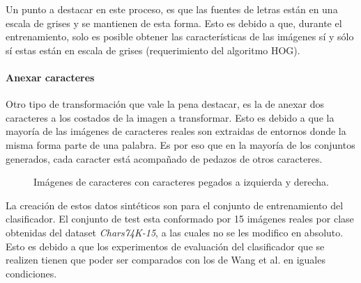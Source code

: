 			Un punto a destacar en este proceso, es que las fuentes de letras están en una escala de grises y se mantienen de esta forma. Esto es debido a que, durante el entrenamiento, solo es posible obtener las características de las imágenes sí y sólo sí estas están en escala de grises (requerimiento del algoritmo HOG). 
			
		\paragraph{Anexar caracteres}
					
			Otro tipo de transformación que vale la pena destacar, es la de anexar dos caracteres a los costados de la imagen a transformar. Esto es debido a que la mayoría de las imágenes de caracteres reales son extraidas de entornos donde la misma forma parte de una palabra. Es por eso que en la mayoría de los conjuntos generados, cada caracter está acompañado de pedazos de otros caracteres.
			
		\begin{figure}[htbp]
			\centering
			\caption[Caracteres pegados]{Imágenes de caracteres con caracteres pegados a izquierda y derecha.}
			\label{fig: Imagen anexos}
		\end{figure}

			La creación de estos datos sintéticos son para el conjunto de entrenamiento del clasificador. El conjunto de test esta conformado por 15 imágenes reales por clase obtenidas del dataset \textit{Chars74K-15}, a las cuales no se les modifico en absoluto. Esto es debido a que los experimentos de evaluación del clasificador que se realizen tienen que poder ser comparados con los de Wang et al. en iguales condiciones.


